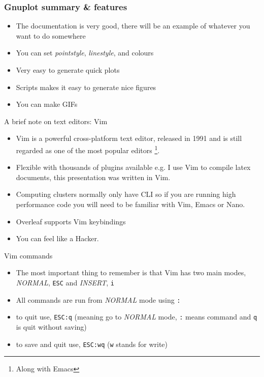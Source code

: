 \documentclass{beamer}
\begin{document}
\begin{frame}
    \frametitle{Gnuplot summary \& features}
    \begin{itemize}
        \item The documentation is very good, there will be an example of whatever you want to do somewhere
        \item You can set \textit{pointstyle}, \textit{linestyle}, and colours 
        \item Very easy to generate quick plots
        \item Scripts makes it easy to generate nice figures
        \item You can make GIFs
    \end{itemize}
\end{frame}


\begin{frame}{A brief note on text editors: Vim}
    \begin{itemize}
    \item Vim is a powerful cross-platform text editor, released in 1991 and is still regarded as one of the most popular editors \footnote{Along with Emacs}. 
    \item Flexible with thousands of plugins available e.g. I use Vim to compile latex documents, this presentation was written in Vim.  
    \item Computing clusters normally only have CLI so if you are running high performance code you will need to be familiar with Vim, Emacs or Nano.
    \item Overleaf supports Vim keybindings
    \item You can feel like a Hacker.
\end{itemize}
\end{frame}

\begin{frame}{Vim commands}
    \begin{itemize}
        \item The most important thing to remember is that Vim has two main modes, \textit{NORMAL}, \texttt{ESC} and \textit{INSERT}, \texttt{i}
        \item All commands are run from \textit{NORMAL} mode using \texttt{:}
        \item to quit use, \texttt{ESC:q} (meaning go to \textit{NORMAL} mode, \texttt{:} means command and \texttt{q} is quit without saving)
        \item to save and quit use, \texttt{ESC:wq} (\texttt{w} stands for write)
    \end{itemize}
\end{frame}
\end{document}

